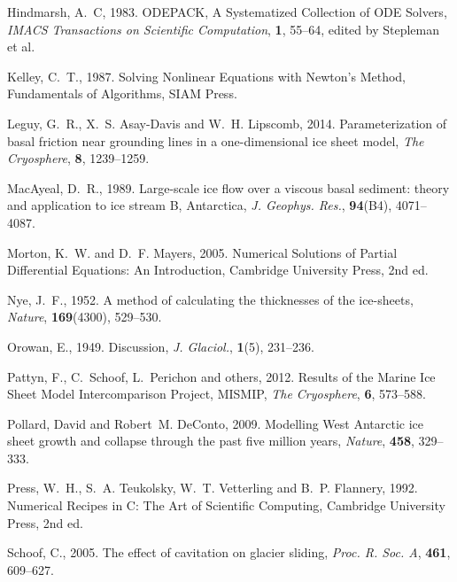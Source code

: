 \documentclass[twocolumn]{igs}
\begin{document}
\begin{thebibliography}{29}
Hindmarsh, A.~C, 1983. {ODEPACK, A Systematized Collection of ODE Solvers},
  {\em IMACS Transactions on Scientific Computation\/}, {\bf 1}, 55--64, edited
  by Stepleman et al.

Kelley, C.~T., 1987. Solving Nonlinear Equations with Newton's Method,
  Fundamentals of Algorithms, SIAM Press.

Leguy, G.~R., X.~S. Asay-Davis and W.~H. Lipscomb, 2014. Parameterization of
  basal friction near grounding lines in a one-dimensional ice sheet model,
  {\em The Cryosphere\/}, {\bf 8}, 1239--1259.

MacAyeal, D.~R., 1989. Large-scale ice flow over a viscous basal sediment:
  theory and application to ice stream {B}, {A}ntarctica, {\em J. Geophys.
  Res.\/}, {\bf 94}(B4), 4071--4087.

Morton, K.~W. and D.~F. Mayers, 2005. Numerical {S}olutions of {P}artial
  {D}ifferential {E}quations: {A}n {I}ntroduction, Cambridge University Press,
  2nd ed.

Nye, J.~F., 1952. A method of calculating the thicknesses of the ice-sheets,
  {\em Nature\/}, {\bf 169}(4300), 529--530.

Orowan, E., 1949. Discussion, {\em J. Glaciol.\/}, {\bf 1}(5), 231--236.

Pattyn, F., C.~Schoof, L.~Perichon and others, 2012. Results of the {M}arine
  {I}ce {S}heet {M}odel {I}ntercomparison {P}roject, {MISMIP}, {\em The
  Cryosphere\/}, {\bf 6}, 573--588.

Pollard, David and Robert~M. DeConto, 2009. Modelling {W}est {A}ntarctic ice
  sheet growth and collapse through the past five million years, {\em
  Nature\/}, {\bf 458}, 329--333.

Press, W.~H., S.~A. Teukolsky, W.~T. Vetterling and B.~P. Flannery, 1992.
  Numerical {R}ecipes in {C}: {T}he {A}rt of {S}cientific {C}omputing,
  Cambridge University Press, 2nd ed.

Schoof, C., 2005. The effect of cavitation on glacier sliding, {\em Proc. R.
  Soc. A\/}, {\bf 461}, 609--627.


\end{thebibliography}
\end{document}
